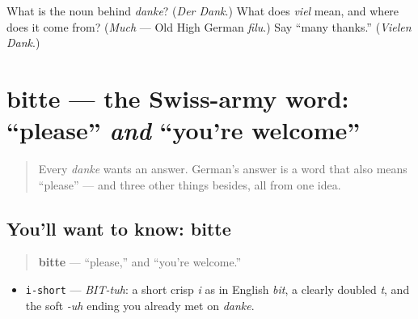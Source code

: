\begin{tcolorbox}[breakable,colback=teal!4,colframe=teal!35!black,title={Before you move on}]
What is the noun behind \emph{danke}? (\emph{Der Dank}.) What does \emph{viel} mean, and where does it come from? (\emph{Much} — Old High German \emph{filu}.) Say \textquotedblleft{}many thanks.\textquotedblright{} (\emph{Vielen Dank}.)
\end{tcolorbox}
\section[bitte]{bitte — the Swiss-army word: \textquotedblleft{}please\textquotedblright{} \emph{and} \textquotedblleft{}you're welcome\textquotedblright{}}

\label{lesson:GE-C03-bitte}



\begin{quote}
Every \emph{danke} wants an answer. German's answer is a word that also means \textquotedblleft{}please\textquotedblright{} — and three other things besides, all from one idea.
\end{quote}

\subsection*{You'll want to know: bitte}
\begin{quote}
\textbf{bitte} — \textquotedblleft{}please,\textquotedblright{} and \textquotedblleft{}you're welcome.\textquotedblright{}
\end{quote}

\begin{sounds}
\begin{itemize}
\raggedright
  \item \texttt{i-short} — \emph{BIT-tuh}: a short crisp \emph{i} as in English \emph{bit}, a clearly doubled \emph{t}, and the soft \emph{-uh} ending you already met on \emph{danke}.
\end{itemize}
\end{sounds}

